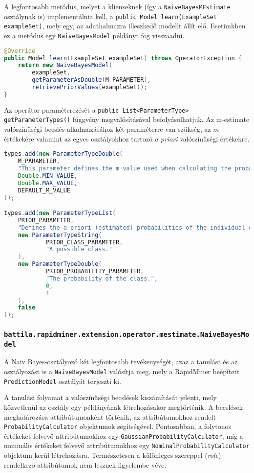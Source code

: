 \documentclass[a4paper]{article}
\begin{document}
A legfontosabb metódus, melyet a klienseknek (így a \texttt{NaiveBayesMEstimate} osztálynak is) implementálnia kell, a \texttt{public Model learn(ExampleSet exampleSet)}, mely egy, az adathalmazra illeszkedő modellt állít elő. Esetünkben ez a metódus egy \texttt{NaiveBayesModel} példányt fog visszaadni.

\begin{lstlisting}[language=Java, caption={A \texttt{learn} metódus implementációja}, captionpos=b, escapechar=$]
@Override
public Model learn(ExampleSet exampleSet) throws OperatorException {
    return new NaiveBayesModel(
        exampleSet,
        getParameterAsDouble(M_PARAMETER),
        retrievePriorValues(exampleSet));
}
\end{lstlisting}


Az operátor paraméterezését a \texttt{public List<ParameterType> getParameterTypes()} függvény megvalósításával befolyásolhatjuk. Az m-estimate valószínűségi becslés alkalmazásához két paraméterre van szükség, az $m$ értékekére valamint az egyes osztályokhoz tartozó \textit{a priori} valószínűségi értékekre.

\begin{lstlisting}[language=Java, caption={A paraméterek definiálása}, captionpos=b, escapechar=$]
types.add(new ParameterTypeDouble(
    M_PARAMETER,
    "This parameter defines the m value used when calculating the probability.",
    Double.MIN_VALUE,
    Double.MAX_VALUE,
    DEFAULT_M_VALUE
));

types.add(new ParameterTypeList(
    PRIOR_PARAMETER,
    "Defines the a priori (estimated) probabilities of the individual classes.",
    new ParameterTypeString(
            PRIOR_CLASS_PARAMETER,
            "A possible class."
    ),
    new ParameterTypeDouble(
            PRIOR_PROBABILITY_PARAMETER,
            "The probability of the class.",
            0,
            1
    ),
    false
));
\end{lstlisting}

\subsubsection{\texttt{battila.rapidminer.extension.operator.mestimate.NaiveBayesModel}}

A Naiv Bayes-osztályozó két legfontosabb tevékenységét, azaz a tanulást és az osztályozást is a \texttt{NaiveBayesModel} valósítja meg, mely a RapidMiner beépített \texttt{PredictionModel} osztályát terjeszti ki.

A tanulási folyamat a valószínűségi becslések kiszámítását jelenti, mely közvetlenül az osztály egy példányának létrehozásakor megtörténik. A becslések meghatározása attribútumonként történik, az attribútumokhoz rendelt \texttt{ProbabilityCalculator} objektumok segítségével. Pontosabban, a folytonos értékeket felvevő attribútumokhoz egy \texttt{GaussianProbabilityCalculator}, míg a nominális értékeket felvevő attribútumokhoz egy \texttt{NominalProbabilityCalculator} objektum kerül létrehozásra. Természetesen a különleges szereppel (\textit{role}) rendelkező attribútumok nem lesznek figyelembe véve.
\end{document}
